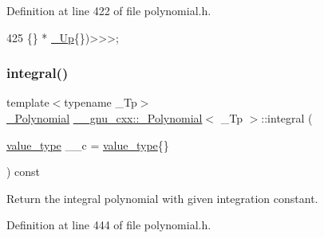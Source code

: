 Definition at line 422 of file polynomial.\+h.


\begin{DoxyCode}
425                                                             \{\} * \hyperlink{class____gnu__cxx_1_1__Polynomial_a242114d4b86648a5dff67a8221f80d40}{\_Up}\{\})>>>;
\end{DoxyCode}
\mbox{\label{class____gnu__cxx_1_1__Polynomial_a4f9871fb66fc6075767f1db61a323fd0}} 
\subsubsection{\texorpdfstring{integral()}{integral()}}
{\footnotesize\ttfamily template$<$typename \+\_\+\+Tp$>$ \\
\hyperlink{class____gnu__cxx_1_1__Polynomial}{\+\_\+\+Polynomial} \hyperlink{class____gnu__cxx_1_1__Polynomial}{\+\_\+\+\_\+gnu\+\_\+cxx\+::\+\_\+\+Polynomial}$<$ \+\_\+\+Tp $>$\+::integral (\begin{DoxyParamCaption}\item[{\hyperlink{class____gnu__cxx_1_1__Polynomial_a725563351f50e76084a7a016c06f8a53}{value\+\_\+type}}]{\+\_\+\+\_\+c = {\ttfamily \hyperlink{class____gnu__cxx_1_1__Polynomial_a725563351f50e76084a7a016c06f8a53}{value\+\_\+type}\{\}} }\end{DoxyParamCaption}) const\hspace{0.3cm}{\ttfamily [inline]}}

Return the integral polynomial with given integration constant. 

Definition at line 444 of file polynomial.\+h.


